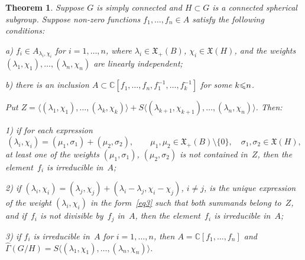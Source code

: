 \documentclass[12pt]{amsart}
\newtheorem{theorem}{Theorem}
\theoremstyle{definition}
\theoremstyle{remark}
\begin{document}
\begin{theorem}
\label{th7} Suppose $G$ is simply connected and $H\subset G$ is a
connected spherical subgroup. Suppose non-zero functions
$f_1,\dots,f_n\in A$ satisfy the following conditions:

{\rm a)} $f_i\in A_{\lambda_i,\chi_i}$ for $i=1,\dots,n$, where
$\lambda_i\in\mathfrak{X}_+(B)$, $\chi_i\in\mathfrak{X}(H)$, and the
weights $(\lambda_1,\chi_1),\dots,(\lambda_n,\chi_n)$ are linearly
independent;

{\rm b)} there is an inclusion $A\subset
\mathbb{C}[f_1,\dots,f_n,f_1^{-1},\dots,f_k^{-1}]$ for some
$k{\leqslant}\nobreak n$.

Put $Z=\langle(\lambda_1,\chi_1),\dots,(\lambda_k,\chi_k)\rangle+
S\langle(\lambda_{k+1},\chi_{k+1}),\dots,(\lambda_n,\chi_n)\rangle$.
Then:

{\rm 1)} if for each expression
\begin{equation}
\label{eq3}
(\lambda_i,\chi_i)=(\mu_1,\sigma_1)+(\mu_2,\sigma_2),\qquad
\mu_1,\mu_2 \in \mathfrak{X}_+(B)\setminus\{0\},\quad
\sigma_1,\sigma_2 \in\mathfrak{X}(H),
\end{equation}
at least one of the weights $(\mu_1,\sigma_1)$, $(\mu_2,\sigma_2)$
is not contained in~$Z$, then the element~$f_i$ is irreducible
in~$A$;

{\rm 2)} if
$(\lambda_i,\chi_i)=(\lambda_j,\chi_j)+(\lambda_i-\lambda_j,\chi_i-\chi_j)$,
$i\ne j$, is the unique expression of the weight
$(\lambda_i,\chi_i)$ in the form~\eqref{eq3} such that both summands
belong to~$Z$, and if~$f_i$ is not divisible by~$f_j$ in~$A$, then
the element~$f_i$ is irreducible in~$A$;

{\rm 3)} if $f_i$ is irreducible in~$A$ for $i=1,\dots,n$, then
$A=\mathbb{C}[f_1,\dots,f_n]$ and $\widehat\Gamma(G/H)=
S\langle(\lambda_1,\chi_1),\dots,(\lambda_n,\chi_n)\rangle$.
\end{theorem}
\end{document}
